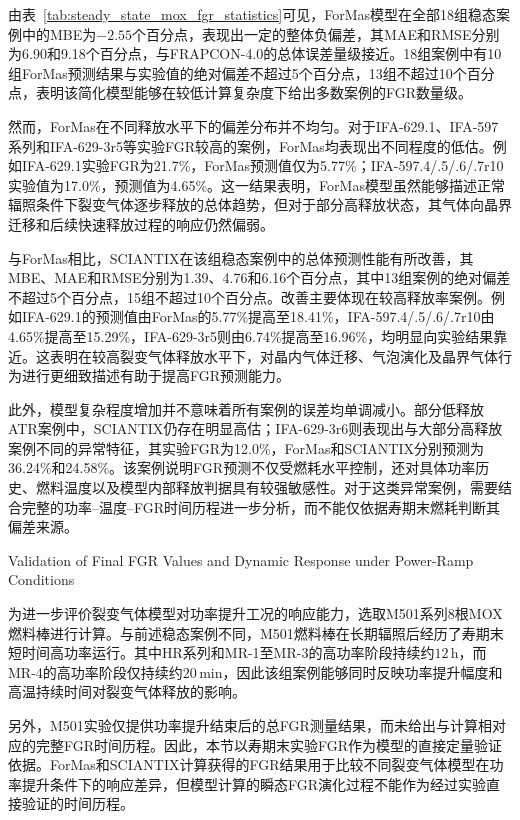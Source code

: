 由表~\ref{tab:steady_state_mox_fgr_statistics}可见，ForMas模型在全部18组稳态案例中的MBE为$-2.55$个百分点，表现出一定的整体负偏差，其MAE和RMSE分别为6.90和9.18个百分点，与FRAPCON-4.0的总体误差量级接近。18组案例中有10组ForMas预测结果与实验值的绝对偏差不超过5个百分点，13组不超过10个百分点，表明该简化模型能够在较低计算复杂度下给出多数案例的FGR数量级。

然而，ForMas在不同释放水平下的偏差分布并不均匀。对于IFA-629.1、IFA-597系列和IFA-629-3r5等实验FGR较高的案例，ForMas均表现出不同程度的低估。例如IFA-629.1实验FGR为21.7\%，ForMas预测值仅为5.77\%；IFA-597.4/.5/.6/.7r10实验值为17.0\%，预测值为4.65\%。这一结果表明，ForMas模型虽然能够描述正常辐照条件下裂变气体逐步释放的总体趋势，但对于部分高释放状态，其气体向晶界迁移和后续快速释放过程的响应仍然偏弱。

与ForMas相比，SCIANTIX在该组稳态案例中的总体预测性能有所改善，其MBE、MAE和RMSE分别为1.39、4.76和6.16个百分点，其中13组案例的绝对偏差不超过5个百分点，15组不超过10个百分点。改善主要体现在较高释放率案例。例如IFA-629.1的预测值由ForMas的5.77\%提高至18.41\%，IFA-597.4/.5/.6/.7r10由4.65\%提高至15.29\%，IFA-629-3r5则由6.74\%提高至16.96\%，均明显向实验结果靠近。这表明在较高裂变气体释放水平下，对晶内气体迁移、气泡演化及晶界气体行为进行更细致描述有助于提高FGR预测能力。

此外，模型复杂程度增加并不意味着所有案例的误差均单调减小。部分低释放ATR案例中，SCIANTIX仍存在明显高估；IFA-629-3r6则表现出与大部分高释放案例不同的异常特征，其实验FGR为12.0\%，ForMas和SCIANTIX分别预测为36.24\%和24.58\%。该案例说明FGR预测不仅受燃耗水平控制，还对具体功率历史、燃料温度以及模型内部释放判据具有较强敏感性。对于这类异常案例，需要结合完整的功率--温度--FGR时间历程进一步分析，而不能仅依据寿期末燃耗判断其偏差来源。


{Validation of Final FGR Values and Dynamic Response under Power-Ramp Conditions}

为进一步评价裂变气体模型对功率提升工况的响应能力，选取M501系列8根MOX燃料棒进行计算。与前述稳态案例不同，M501燃料棒在长期辐照后经历了寿期末短时间高功率运行。其中HR系列和MR-1至MR-3的高功率阶段持续约$12\,\mathrm{h}$，而MR-4的高功率阶段仅持续约$20\,\mathrm{min}$，因此该组案例能够同时反映功率提升幅度和高温持续时间对裂变气体释放的影响。

另外，M501实验仅提供功率提升结束后的总FGR测量结果，而未给出与计算相对应的完整FGR时间历程。因此，本节以寿期末实验FGR作为模型的直接定量验证依据。ForMas和SCIANTIX计算获得的FGR结果用于比较不同裂变气体模型在功率提升条件下的响应差异，但模型计算的瞬态FGR演化过程不能作为经过实验直接验证的时间历程。

